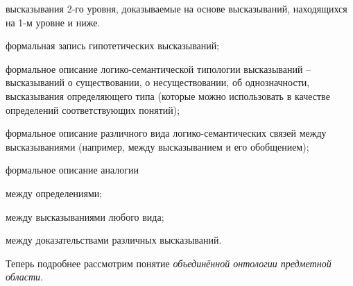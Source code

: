 \begin{textitemize}
\begin{textitemize}
		\item высказывания 2-го уровня, доказываемые на основе высказываний, находящихся на 1-м уровне и ниже.
	\end{textitemize}
	\item формальная запись гипотетических высказываний;
	\item формальное описание логико-семантической типологии высказываний -- высказываний о существовании, о несуществовании, об однозначности, высказывания определяющего  типа (которые можно использовать в качестве определений соответствующих понятий);
	\item формальное описание различного вида логико-семантических связей между высказываниями (например, между высказыванием и его обобщением);
	\item формальное описание аналогии
	\begin{textitemize}
		\item между определениями;	
		\item между высказываниями любого вида;
		\item между доказательствами различных высказываний.
	\end{textitemize}
\end{textitemize}    

\begin{SCn}
\end{SCn}

Теперь подробнее рассмотрим понятие \textit{объединённой онтологии предметной области}.

